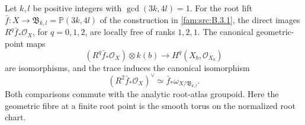 \begin{proposition}\hypertarget{tag-033I}{}\label{push:src:E.3.1}

Let $k,l$ be positive integers with $\gcd(3k,4l)=1$.
For the root lift $\bar f:X\to\mathfrak B_{k,l}=\mathbb P(3k,4l)$
of the construction in \cref{fam:src:B.3.1}, the direct images
$R^q\bar f_*\mathcal O_X$, for $q=0,1,2$, are locally free of
ranks $1,2,1$. The canonical geometric-point maps
\[
 (R^q\bar f_*\mathcal O_X)\otimes k(b)
 \longrightarrow H^q(X_b,\mathcal O_{X_b})
\]
are isomorphisms, and the trace induces the canonical isomorphism
\[
 (R^2\bar f_*\mathcal O_X)^\vee
 \simeq\bar f_*\omega_{X/\mathfrak B_{k,l}}.
\]
Both comparisons commute with the analytic root-atlas groupoid.
Here the geometric fibre at a finite root point is the smooth torus
on the normalized root chart.
\end{proposition}

